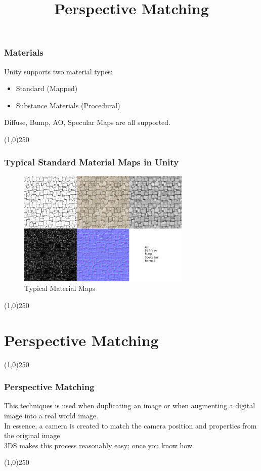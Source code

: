 \begin{frame}
\frametitle{Materials}
Unity supports two material types:
\begin{itemize}
	\item Standard (Mapped)
	\item Substance Materials (Procedural)
\end{itemize}
Diffuse, Bump, AO, Specular Maps are all supported.
\end{frame}
\begin{center}\line(1,0){250}\end{center}


\begin{frame}
\frametitle{Typical Standard Material Maps in Unity}
\begin{figure}
	\centering
	\includegraphics[height=5.5cm]{./img/Unity/Materials.jpg}
	\caption[Typical Material Maps]{Typical Material Maps}
	\label{fig:}
\end{figure}
\end{frame}
\begin{center}\line(1,0){250}\end{center}




\section{Perspective Matching}
\begin{frame}
	\title[Perspective Matching]{Perspective Matching}
	\titlepage
\end{frame}\begin{center}\line(1,0){250}\end{center}

\begin{frame}
	\frametitle{Perspective Matching}
	This techniques is used when duplicating an image or when augmenting a digital image into a real world image.\\
	In essence, a camera is created to match the camera position and properties from the original image\\
	3DS makes this process reasonably easy; once you know how
	
\end{frame}
\begin{center}\line(1,0){250}\end{center}


